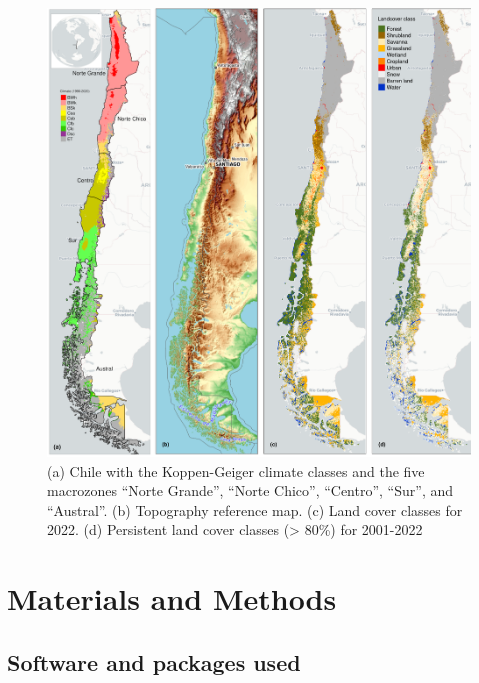 \documentclass[
  number,
  preprint,
  3p,
  onecolumn]{elsarticle}
\begin{document}
\begin{figure}[!ht]

{\centering \includegraphics{../output/figs/map_study_con_landcover.png}

}

\caption{\label{fig-studyArea}(a) Chile with the Koppen-Geiger climate
classes and the five macrozones ``Norte Grande'', ``Norte Chico'',
``Centro'', ``Sur'', and ``Austral''. (b) Topography reference map. (c)
Land cover classes for 2022. (d) Persistent land cover classes
(\textgreater{} 80\%) for 2001-2022}

\end{figure}

\hypertarget{materials-and-methods}{%
\section{Materials and Methods}\label{materials-and-methods}}

\hypertarget{software-and-packages-used}{%
\subsection{Software and packages
used}\label{software-and-packages-used}}
\end{document}
